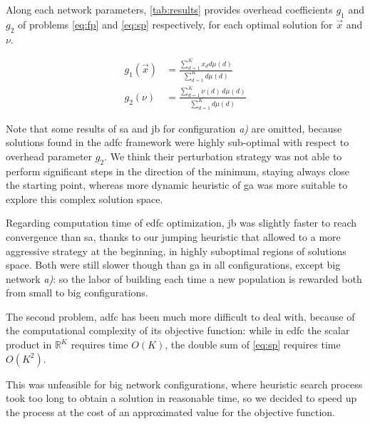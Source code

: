 \documentclass[12pt,journal,draftclsnofoot,onecolumn]{IEEEtran}
\begin{document}
Along each network parameters, \autoref{tab:results} provides overhead coefficients $g_1$ and $g_2$ of problems \autoref{eq:fp} and \autoref{eq:sp} respectively, for each optimal solution for $\vec{x}$ and $\nu$.\cite{Lin2007}

\begin{equation*}
	\begin{split}
		g_1(\vec{x}) &= \frac{\sum_{d=1}^K x_d d \mu (d)}{\sum_{d=1}^K d \mu (d)} \\
		g_2(\nu) &= \frac{\sum_{d=1}^K \nu(d) \, d \mu (d)}{\sum_{d=1}^K d \mu (d)}
	\end{split}
\end{equation*} \vspace{0cm}

Note that some results of \gls{sa} and \gls{jb} for configuration \emph{a)} are omitted, because solutions found in the \gls{adfc} framework were highly sub-optimal with respect to overhead parameter $g_2$.
We think their perturbation strategy was not able to perform significant steps in the direction of the minimum, staying always close the starting point, whereas more dynamic heuristic of \gls{ga} was more suitable to explore this complex solution space.

\smallbreak
Regarding computation time of \gls{edfc} optimization, \gls{jb} was slightly faster to reach convergence than \gls{sa}, thanks to our jumping heuristic that allowed to a more aggressive strategy at the beginning, in highly suboptimal regions of solutions space.
Both were still slower though than \gls{ga} in all configurations, except big network \emph{a)}: so the labor of building each time a new population is rewarded both from small to big configurations.

\smallbreak
The second problem, \gls{adfc} has been much more difficult to deal with, because of the computational complexity of its objective function: while in \gls{edfc} the scalar product in $\mathbb{R}^K$ requires time $O(K)$, the double sum of \autoref{eq:sp} requires time $O(K^2)$.

This was unfeasible for big network configurations, where heuristic search process took too long to obtain a solution in reasonable time, so we decided to speed up the process at the cost of an approximated value for the objective function.
\end{document}

